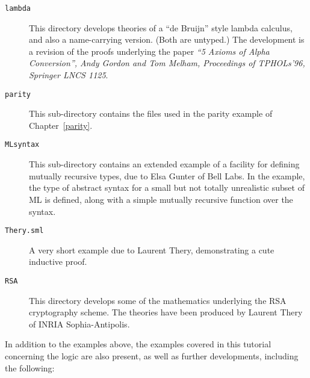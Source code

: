 \begin{description}
\item[\tt lambda]

This directory develops theories of a ``de Bruijn'' style lambda calculus,
and also a name-carrying version. (Both are untyped.) The development
is a revision of the proofs underlying the paper
{\it ``5 Axioms of Alpha Conversion'',
            Andy Gordon and Tom Melham,
            Proceedings of TPHOLs'96, Springer LNCS 1125}.

\item[\tt parity]

  This sub-directory contains the files used in the parity example of
  Chapter~\ref{parity}.

\item [\tt MLsyntax]

  This sub-directory contains an extended example of a facility for
  defining mutually recursive types, due to Elsa Gunter of Bell Labs.
  In the example, the type of abstract syntax for a small but not
  totally unrealistic subset of ML is defined, along with a simple
  mutually recursive function over the syntax.

\item[\tt Thery.sml]

  A very short example due to Laurent Thery, demonstrating a cute
  inductive proof.

\item[\tt RSA]

       This directory develops some of the mathematics underlying
       the RSA cryptography scheme. The theories have been
       produced by Laurent Thery of INRIA Sophia-Antipolis.

\end{description}

In addition to the examples above, the examples covered in this
tutorial concerning the \HOLW{} logic are also present, 
as well as further developments, including the following: 

